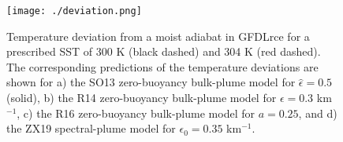 \documentclass[11pt]{article}
\begin{document}
\begin{figure}[htbp]
\centering
\texttt{[image: ./deviation.png]}
\caption{\label{fig:orga3faa8f}Temperature deviation from a moist adiabat in GFDLrce for a prescribed SST of 300 K (black dashed) and 304 K (red dashed). The corresponding predictions of the temperature deviations are shown for a) the SO13 zero-buoyancy bulk-plume model for \(\hat{\epsilon}=0.5\) (solid), b) the R14 zero-buoyancy bulk-plume model for \(\epsilon=0.3\) km\(^{-1}\), c) the R16 zero-buoyancy bulk-plume model for \(a=0.25\), and d) the ZX19 spectral-plume model for \(\epsilon_0=0.35\) km\(^{-1}\).}
\end{figure}



\end{document}
